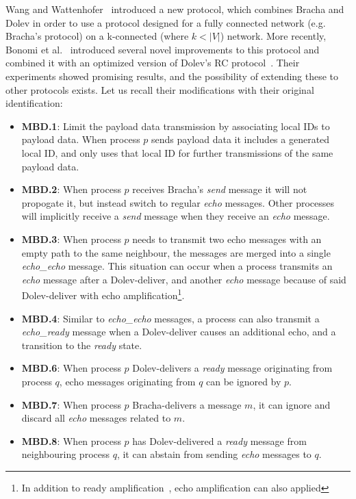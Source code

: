 Wang and Wattenhofer~\cite{bracha-dolev} introduced a new protocol, which combines Bracha and Dolev in order to use a protocol designed for a fully connected network (e.g. Bracha's protocol) on a k-connected (where $k < |V|$) network. More recently, Bonomi et al.~\cite{bonomi2021practical} introduced several novel improvements to this protocol and combined it with an optimized version of Dolev's RC protocol~\cite{dolev-improvement,bonomi2019multihop}. Their experiments showed promising results, and the possibility of extending these to other protocols exists. Let us recall their modifications with their original identification:
\begin{itemize}
    \item \textbf{MBD.1}: Limit the payload data transmission by associating local IDs to payload data. When process $p$ sends payload data it includes a generated local ID, and only uses that local ID for further transmissions of the same payload data. 
    \item \textbf{MBD.2}: When process $p$ receives Bracha's \textit{send} message it will not propogate it, but instead switch to regular \textit{echo} messages. Other processes will implicitly receive a \textit{send} message when they receive an \textit{echo} message.
    \item \textbf{MBD.3}: When process $p$ needs to transmit two echo messages with an empty path to the same neighbour, the messages are merged into a single \textit{echo\_echo} message. This situation can occur when a process transmits an \textit{echo} message after a Dolev-deliver, and another \textit{echo} message because of said Dolev-deliver with echo amplification\footnote{In addition to ready amplification~\citationneeded, echo amplification can also applied}.
    \item \textbf{MBD.4}: Similar to \textit{echo\_echo} messages, a process can also transmit a \textit{echo\_ready} message when a Dolev-deliver causes an additional echo, and a transition to the \textit{ready} state.
    \item \textbf{MBD.6}: When process $p$ Dolev-delivers a \textit{ready} message originating from process $q$, echo messages originating from $q$ can be ignored by $p$.
    \item \textbf{MBD.7}: When process $p$ Bracha-delivers a message $m$, it can ignore and discard all \textit{echo} messages related to $m$.
    \item \textbf{MBD.8}: When process $p$ has Dolev-delivered a \textit{ready} message from neighbouring process $q$, it can abstain from sending \textit{echo} messages to $q$.

\end{itemize}
